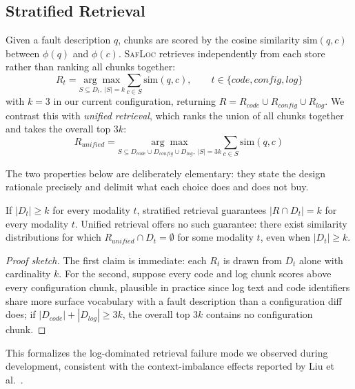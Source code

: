 \documentclass[runningheads]{llncs}
\begin{document}
\subsection{Stratified Retrieval}
\label{sec:stratified}

Given a fault description $q$, chunks are scored by the cosine similarity $\text{sim}(q, c)$ between $\phi(q)$ and $\phi(c)$. \textsc{SafLoc} retrieves independently from each store rather than ranking all chunks together:
\begin{equation}
  R_t = \underset{S \subseteq D_t,\ |S| = k}{\arg\max} \sum_{c \in S} \text{sim}(q, c), \qquad t \in \{code, config, log\}
  \label{eq:stratified}
\end{equation}
with $k = 3$ in our current configuration, returning $R = R_{code} \cup R_{config} \cup R_{log}$. We contrast this with \emph{unified retrieval}, which ranks the union of all chunks together and takes the overall top $3k$:
\begin{equation}
  R_{unified} = \underset{S \subseteq D_{code} \cup D_{config} \cup D_{log},\ |S| = 3k}{\arg\max} \sum_{c \in S} \text{sim}(q, c)
  \label{eq:unified}
\end{equation}

The two properties below are deliberately elementary: they state the design rationale precisely and delimit what each choice does and does not buy.

\begin{proposition}
\label{prop:coverage}
If $|D_t| \ge k$ for every modality $t$, stratified retrieval guarantees $|R \cap D_t| = k$ for every modality $t$. Unified retrieval offers no such guarantee: there exist similarity distributions for which $R_{unified} \cap D_t = \emptyset$ for some modality $t$, even when $|D_t| \ge k$.
\end{proposition}

\begin{proof}[Proof sketch]
The first claim is immediate: each $R_t$ is drawn from $D_t$ alone with cardinality $k$. For the second, suppose every code and log chunk scores above every configuration chunk, plausible in practice since log text and code identifiers share more surface vocabulary with a fault description than a configuration diff does; if $|D_{code}| + |D_{log}| \ge 3k$, the overall top $3k$ contains no configuration chunk.
\end{proof}

This formalizes the log-dominated retrieval failure mode we observed during development, consistent with the context-imbalance effects reported by Liu et al.~\cite{liu2024lostinmiddle}.
\end{document}
